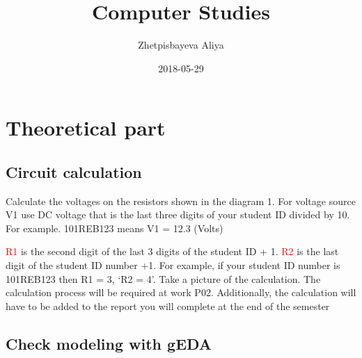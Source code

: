 \documentclass{report}
\title{Computer Studies}
\date{2018-05-29}
\author{Zhetpisbayeva Aliya}
\begin{document}
\maketitle
\newpage
\tableofcontents{}
\newpage
\chapter{Theoretical part}
\section{Circuit calculation} 

Calculate the voltages on the resistors shown in the diagram 1. For voltage source V1 use DC
voltage that is the last three digits of your student ID divided by 10. For example. 101REB123
means V1 = 12.3 (Volts)

\textcolor{red}{R1} is the second digit of the last 3 digits of the student ID + 1. \textcolor{red}{R2} is the last digit of the
student ID number +1. For example, if your student ID number is 101REB123 then R1 = 3,
‘R2 = 4’.
Take a picture of the calculation. The calculation process will be required at work P02.
Additionally, the calculation will have to be added to the report you will complete at the end of
the semester\cite{firstRef, fifthRef}

\section{Check modeling with gEDA}
\end{document}
